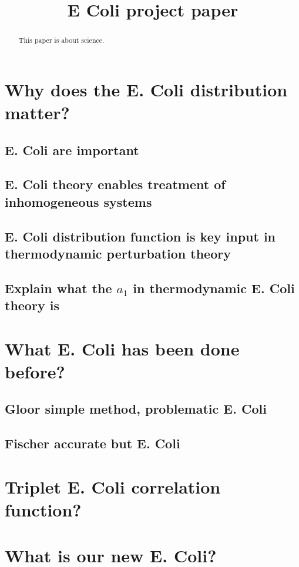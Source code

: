 \documentclass[letterpaper,twocolumn,amsmath,amssymb,pre]{revtex4-1}
\begin{document}
\title{E Coli project paper}

\begin{abstract}
  This paper is about science.
\end{abstract}

\section{Why does the E. Coli distribution matter?}
\subsection{E. Coli are important}
\subsection{E. Coli theory enables treatment of inhomogeneous systems}
\subsection{E. Coli distribution function is key input in thermodynamic perturbation theory}
\subsection{Explain what the $a_1$ in thermodynamic E. Coli theory is}

\section{What E. Coli has been done before?}
\subsection{Gloor simple method, problematic E. Coli}

\subsection{Fischer accurate but E. Coli}

\section{Triplet E. Coli correlation function?}

\section{What is our new E. Coli?}
\end{document}
